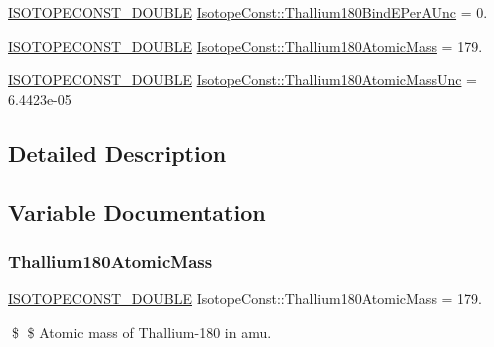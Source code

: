 \begin{DoxyCompactItemize}
\mbox{\hyperlink{group___isotope_const-_macros_ga8f45a7272ce02c0b4c65c44636ed719a}{I\+S\+O\+T\+O\+P\+E\+C\+O\+N\+S\+T\+\_\+\+D\+O\+U\+B\+LE}} \mbox{\hyperlink{group___isotope_const-_thallium-_tl180_ga618de0ba75f3903b6b0c8e81de3eae48}{Isotope\+Const\+::\+Thallium180\+Bind\+E\+Per\+A\+Unc}} = 0.
\item 
\mbox{\hyperlink{group___isotope_const-_macros_ga8f45a7272ce02c0b4c65c44636ed719a}{I\+S\+O\+T\+O\+P\+E\+C\+O\+N\+S\+T\+\_\+\+D\+O\+U\+B\+LE}} \mbox{\hyperlink{group___isotope_const-_thallium-_tl180_ga1916713c2f3939a505470954a4b9545b}{Isotope\+Const\+::\+Thallium180\+Atomic\+Mass}} = 179.
\item 
\mbox{\hyperlink{group___isotope_const-_macros_ga8f45a7272ce02c0b4c65c44636ed719a}{I\+S\+O\+T\+O\+P\+E\+C\+O\+N\+S\+T\+\_\+\+D\+O\+U\+B\+LE}} \mbox{\hyperlink{group___isotope_const-_thallium-_tl180_ga67fe8f825c85d6ba669eb85cc128ab06}{Isotope\+Const\+::\+Thallium180\+Atomic\+Mass\+Unc}} = 6.\+4423e-\/05
\end{DoxyCompactItemize}


\subsection{Detailed Description}


\subsection{Variable Documentation}
\mbox{\label{group___isotope_const-_thallium-_tl180_ga1916713c2f3939a505470954a4b9545b}} 
\subsubsection{\texorpdfstring{Thallium180\+Atomic\+Mass}{Thallium180AtomicMass}}
{\footnotesize\ttfamily \mbox{\hyperlink{group___isotope_const-_macros_ga8f45a7272ce02c0b4c65c44636ed719a}{I\+S\+O\+T\+O\+P\+E\+C\+O\+N\+S\+T\+\_\+\+D\+O\+U\+B\+LE}} Isotope\+Const\+::\+Thallium180\+Atomic\+Mass = 179.}

\$ \$ Atomic mass of Thallium-\/180 in amu. \mbox{\label{group___isotope_const-_thallium-_tl180_ga67fe8f825c85d6ba669eb85cc128ab06}} 
